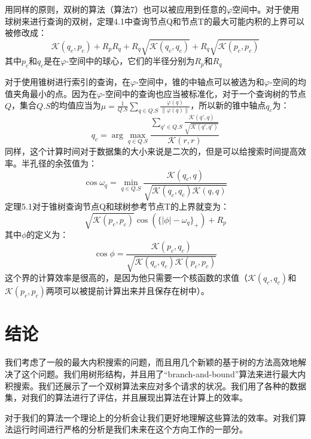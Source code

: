 \documentclass[twocolumn]{article}
\begin{document}
用同样的原则，双树的算法（算法7）也可以被应用到任意的$\varphi$空间中。对于使用球树来进行查询的双树，定理4.1中查询节点Q和节点T的最大可能内积的上界可以被修改成：
\begin{equation}
\mathcal{K}(q_c, p_c) + R_p R_q + R_q \sqrt{\mathcal{K}(q_c,q_c)} + R_q \sqrt{\mathcal{K}(p_c, p_c)}
\end{equation}
其中$p_c$和$q_c$是在$\varphi$-空间中的球心，它们的半径分别为$R_p$和$R_q$

对于使用锥树进行索引的查询，在$\varphi$-空间中，锥的中轴点可以被选为和$\varphi$-空间的均值夹角最小的点。因为在$\varphi$-空间中的查询也应当被标准化，对于一个查询树的节点$Q$，集合$Q.S$的均值应当为$\mu=\frac{1}{Q.S}\sum_{q \in Q.S}\frac{\varphi(q)}{\|\varphi(q)\|}$，所以新的锥中轴点$q_c$为：
\begin{equation}
q_c = \arg \max_{q\in Q.S}\frac{\sum_{q'\in Q.S}\frac{\mathcal{K}(q',q)}{\sqrt{\mathcal{K}(q',q')}}}{\mathcal{K}(r,r)}
\end{equation}
同样，这个计算时间对于数据集的大小来说是二次的，但是可以给搜索时间提高效率。半孔径的余弦值为：
\begin{equation}
\cos\omega_q = \min_{q \in Q.S}\frac{\mathcal{K}(q_c, q)}{\sqrt{\mathcal{K}(q_c, q_c)\mathcal{K}(q,q)}}
\end{equation}
定理5.1对于锥树查询节点Q和球树参考节点T的上界就变为：
\begin{equation}
\sqrt{\mathcal{K}(p_c, p_c)}\cos(\{|\phi| - \omega_q\}_+) + R_p
\end{equation}
其中$\phi$的定义为：
\begin{equation*}
\cos\phi = \frac{\mathcal{K}(p_c, q_c)}{\sqrt{\mathcal{K}(q_c, q_c)\mathcal{K}(p_c,p_c)}}
\end{equation*}
这个界的计算效率是很高的，是因为他只需要一个核函数的求值（$\mathcal{K}(q_c, q_c)$和$\mathcal{K}(p_c,p_c)$两项可以被提前计算出来并且保存在树中）。

\section{结论}

我们考虑了一般的最大内积搜索的问题，而且用几个新颖的基于树的方法高效地解决了这个问题。我们用树形结构，并且用了“branch-and-bound”算法来进行最大内积搜索。我们还展示了一个双树算法来应对多个请求的状况。我们用了各种的数据集，对我们的算法进行了评估，并且展现出算法在计算上的效率。

对于我们的算法一个理论上的分析会让我们更好地理解这些算法的效率。对我们算法运行时间进行严格的分析是我们未来在这个方向工作的一部分。
\end{document}
